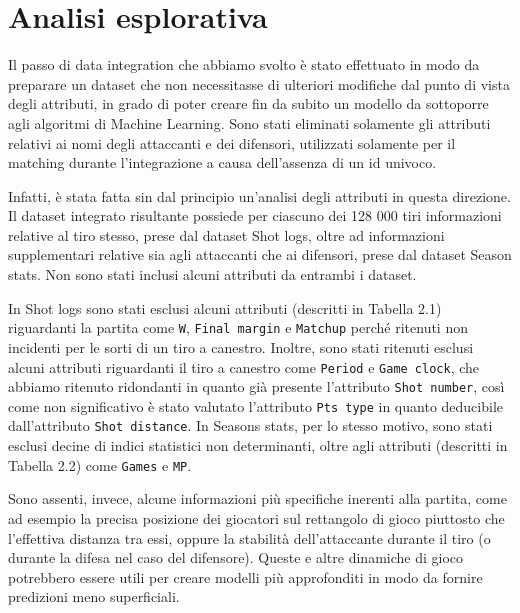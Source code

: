 \section{Analisi esplorativa}

Il passo di data integration che abbiamo svolto è stato effettuato in modo da preparare un dataset che non necessitasse di ulteriori modifiche dal punto di vista degli attributi, in grado di poter creare fin da subito un modello da sottoporre agli algoritmi di Machine Learning. Sono stati eliminati solamente gli attributi relativi ai nomi degli attaccanti e dei difensori, utilizzati solamente per il matching durante l’integrazione a causa dell’assenza di un id univoco.

\par
Infatti, è stata fatta sin dal principio un’analisi degli attributi in questa direzione. Il dataset integrato risultante possiede per ciascuno dei 128 000 tiri informazioni relative al tiro stesso, prese dal dataset Shot logs, oltre ad informazioni supplementari relative sia agli attaccanti che ai difensori, prese dal dataset Season stats. Non sono stati inclusi alcuni attributi da entrambi i dataset.
\par

In Shot logs sono stati esclusi alcuni attributi (descritti in Tabella 2.1) riguardanti la partita come \texttt{W}, \texttt{Final margin} e \texttt{Matchup} perché ritenuti non incidenti per le sorti di un tiro a canestro. Inoltre, sono stati ritenuti esclusi alcuni attributi riguardanti il tiro a canestro come \texttt{Period} e \texttt{Game clock}, che abbiamo ritenuto ridondanti in quanto già presente l'attributo \texttt{Shot number}, così come non significativo è stato valutato l'attributo \texttt{Pts type} in quanto deducibile dall'attributo \texttt{Shot distance}. In Seasons stats, per lo stesso motivo, sono stati esclusi decine di indici statistici non determinanti, oltre agli attributi (descritti in Tabella 2.2) come \texttt{Games} e \texttt{MP}.

\par
Sono assenti, invece, alcune informazioni più specifiche inerenti alla partita, come ad esempio la precisa posizione dei giocatori sul rettangolo di gioco piuttosto che l’effettiva distanza tra essi, oppure la stabilità dell’attaccante durante il tiro (o durante la difesa nel caso del difensore). Queste e altre dinamiche di gioco potrebbero essere utili per creare modelli più approfonditi in modo da fornire predizioni meno superficiali.

